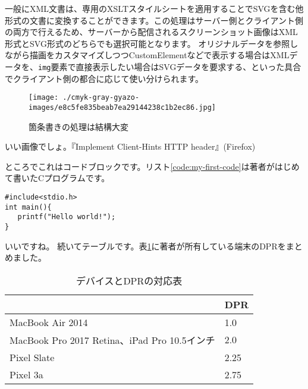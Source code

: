 一般にXML文書は、専用のXSLTスタイルシートを適用することでSVGを含む他形式の文書に変換することができます。この処理はサーバー側とクライアント側の両方で行えるため、サーバーから配信されるスクリーンショット画像はXML形式とSVG形式のどちらでも選択可能となります。
オリジナルデータを参照しながら描画をカスタマイズしつつCustomElementなどで表示する場合はXMLデータを、{\tt img}要素で直接表示したい場合はSVGデータを要求する、といった具合でクライアント側の都合に応じて使い分けられます。\\

\begin{figure}[h]
  \begin{center}
     \texttt{[image: ./cmyk-gray-gyazo-images/e8c5fe835beab7ea29144238c1b2ec86.jpg]}
     \caption{箇条書きの処理は結構大変}
     \label{fig:xslt-story}
  \end{center}
\end{figure}

いい画像でしょ。『Implement Client-Hints HTTP header』(Firefox)\par
ところでこれはコードブロックです。リスト\ref{code:my-first-code}は著者がはじめて書いたCプログラムです。
\begin{lstlisting}[frame=tb,label=code:my-first-code,caption=my\_first\_code.c]
#include<stdio.h>
int main(){
   printf("Hello world!");
}
\end{lstlisting}

いいですね。
続いてテーブルです。表\ref{table:dpr}に著者が所有している端末のDPRをまとめました。
\begin{table}[htb]
\begin{center}
  \caption{デバイスとDPRの対応表}
  \label{table:dpr}
  \begin{tabular}{|l|l|} \hline
     & DPR \\ \hline
    MacBook Air 2014 & 1.0 \\
    MacBook Pro 2017 Retina、iPad Pro 10.5インチ & 2.0 \\
    Pixel Slate & 2.25 \\
    Pixel 3a & 2.75 \\ \hline
  \end{tabular}
\end{center}
\end{table}


